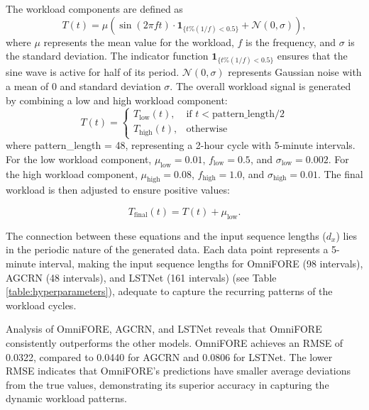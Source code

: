 \documentclass{ieeetmlcn}
\begin{document}
The workload components are defined as 
\begin{equation}
T(t) = \mu \left( \sin(2\pi f t) \cdot \mathbf{1}_{\{t \% (1/f) < 0.5\}} + \mathcal{N}(0, \sigma) \right),
\end{equation}
where $\mu$ represents the mean value for the workload, $f$ is the frequency, and $\sigma$ is the standard deviation. The indicator function $\mathbf{1}_{\{t \% (1/f) < 0.5\}}$ ensures that the sine wave is active for half of its period. $\mathcal{N}(0, \sigma)$ represents Gaussian noise with a mean of 0 and standard deviation $\sigma$. The overall workload signal is generated by combining a low and high workload component:
\begin{equation}
T(t) = \begin{cases} 
T_{\text{low}}(t), & \text{if } t < \text{pattern\_length} / 2 \\
T_{\text{high}}(t), & \text{otherwise}
\end{cases}
\end{equation}
where pattern\_length = 48, representing a 2-hour cycle with 5-minute intervals.
For the low workload component, $\mu_{\text{low}} = 0.01$, $f_{\text{low}} = 0.5$, and $\sigma_{\text{low}} = 0.002$. For the high workload component, $\mu_{\text{high}} = 0.08$, $f_{\text{high}} = 1.0$, and $\sigma_{\text{high}} = 0.01$. The final workload is then adjusted to ensure positive values:

\begin{equation}
T_{\text{final}}(t) = T(t) + \mu_{\text{low}}.
\end{equation}

The connection between these equations and the input sequence lengths ($d_x$) lies in the periodic nature of the generated data. Each data point represents a 5-minute interval, making the input sequence lengths for OmniFORE (98 intervals), AGCRN (48 intervals), and LSTNet (161 intervals) (see Table \ref{table:hyperparameters}), adequate to capture the recurring patterns of the workload cycles.

Analysis of OmniFORE, AGCRN, and LSTNet reveals that OmniFORE consistently outperforms the other models. OmniFORE achieves an RMSE of 0.0322, compared to 0.0440 for AGCRN and 0.0806 for LSTNet. The lower RMSE indicates that OmniFORE's predictions have smaller average deviations from the true values, demonstrating its superior accuracy in capturing the dynamic workload patterns.
\end{document}
